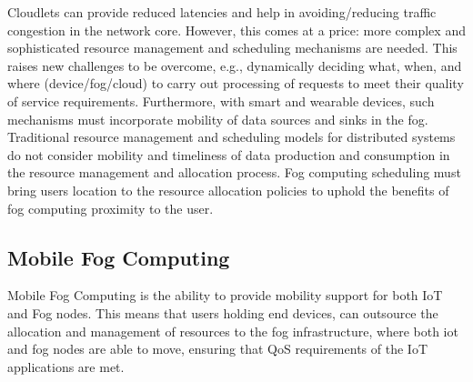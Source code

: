 Cloudlets can provide reduced latencies and help in avoiding/reducing traffic congestion in the network core. However, this comes at a price: more complex and sophisticated resource management and scheduling mechanisms are needed. This raises new challenges to be overcome, e.g., dynamically deciding what, when, and where (device/fog/cloud) to carry out processing of requests to meet their quality of service requirements. Furthermore, with smart and wearable devices, such mechanisms must incorporate mobility of data sources and sinks in the fog. Traditional resource management and scheduling models for distributed systems do not consider mobility and timeliness of data production and consumption in the resource management and allocation process. Fog computing scheduling must bring users location to the resource allocation policies to uphold the benefits of fog computing proximity to the user.









\vfill\pagebreak
\subsection{Mobile Fog Computing}
\label{sec:Mobility}
Mobile Fog Computing is the ability to provide mobility support for both IoT and Fog nodes. This means that users holding end devices, can outsource the allocation and management of resources to the fog infrastructure, where both iot and fog nodes are able to move, ensuring that QoS requirements of the IoT applications are met.\\

